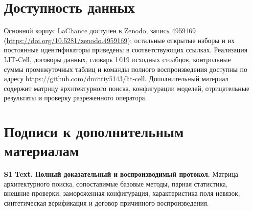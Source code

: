 \documentclass[11pt,a4paper]{article}
\begin{document}
\section*{Доступность данных}
Основной корпус LaChance доступен в Zenodo, запись 4959169 (\url{https://doi.org/10.5281/zenodo.4959169}); остальные открытые наборы и их постоянные идентификаторы приведены в соответствующих ссылках. Реализация LIT-Cell, договоры данных, словарь 1\,019 исходных столбцов, контрольные суммы промежуточных таблиц и команды полного воспроизведения доступны по адресу \url{https://github.com/dmitriy5143/lit-cell}. Дополнительный материал содержит матрицу архитектурного поиска, конфигурации моделей, отрицательные результаты и проверку разреженного оператора.

\section*{Подписи к дополнительным материалам}
\noindent\textbf{S1 Text. Полный доказательный и воспроизводимый протокол.}
Матрица архитектурного поиска, сопоставимые базовые методы, парная статистика, внешние проверки, замороженная конфигурация, характеристика поля невязок, синтетическая верификация и договор причинного воспроизведения.
\end{document}
